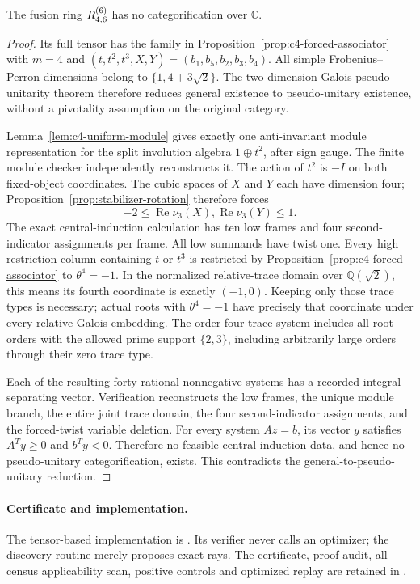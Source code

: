 \begin{theorem}\label{thm:c4-multiplicity-four}
The fusion ring $R^{(6)}_{4,6}$ has no categorification over $\mathbb C$.
\end{theorem}
\begin{proof}
Its full tensor has the family in
Proposition~\ref{prop:c4-forced-associator} with $m=4$ and
$(t,t^2,t^3,X,Y)=(b_1,b_5,b_2,b_3,b_4)$.
All simple Frobenius--Perron dimensions belong to
$\{1,4+3\sqrt2\}$. The two-dimension Galois-pseudo-unitarity
theorem therefore reduces general existence to pseudo-unitary
existence, without a pivotality assumption on the original category.

Lemma~\ref{lem:c4-uniform-module} gives exactly one anti-invariant
module representation for the split involution algebra $1\oplus t^2$,
after sign gauge. The finite module checker independently reconstructs it.
The action of $t^2$ is $-I$ on both fixed-object coordinates.
The cubic spaces of $X$ and $Y$ each have dimension four;
Proposition~\ref{prop:stabilizer-rotation} therefore forces
\[
 -2\leq\operatorname{Re}\nu_3(X),
          \operatorname{Re}\nu_3(Y)\leq1.
\]
The exact central-induction calculation has ten low frames and
four second-indicator assignments per frame. All low summands
have twist one. Every high restriction column containing $t$ or
$t^3$ is restricted by Proposition~\ref{prop:c4-forced-associator}
to $\theta^4=-1$. In the normalized relative-trace domain over
$\mathbb Q(\sqrt2)$, this means its fourth coordinate is exactly
$(-1,0)$. Keeping only those trace types is necessary; actual roots
with $\theta^4=-1$ have precisely that coordinate under every
relative Galois embedding. The order-four trace system includes
all root orders with the allowed prime support $\{2,3\}$,
including arbitrarily large orders through their zero trace type.

Each of the resulting forty rational nonnegative systems has a
recorded integral separating vector. Verification reconstructs
the low frames, the unique module branch, the entire joint trace
domain, the four second-indicator assignments, and the forced-twist
variable deletion. For every system $Az=b$, its vector $y$
satisfies $A^Ty\geq0$ and $b^Ty<0$. Therefore no feasible central
induction data, and hence no pseudo-unitary categorification,
exists. This contradicts the general-to-pseudo-unitary reduction.
\end{proof}

\paragraph{Certificate and implementation.}
The tensor-based implementation is
. Its verifier never calls
an optimizer; the discovery routine merely proposes exact rays.
The certificate, proof audit, all-census applicability scan,
positive controls and optimized replay are retained in
.

